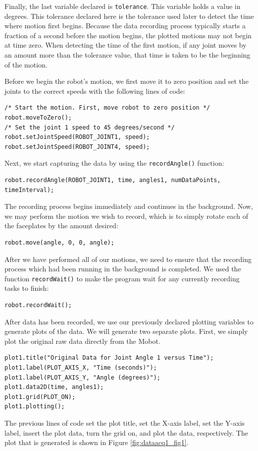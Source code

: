 \documentclass{article}
\begin{document}
Finally, the last variable declared is \texttt{tolerance}. This variable 
holds a value in degrees. This tolerance declared here is the tolerance used
later to detect the time where motion first begins. Because the data recording 
process typically starts a fraction of a second before the motion begins, the
plotted motions may not begin at time zero. When detecting the time of the
first motion, if any joint moves by an amount more than the tolerance value, 
that time is taken to be the beginning of the motion.

Before we begin the robot's motion, we first move it to zero position and set the
joints to the correct speeds with the following lines of code:
\begin{verbatim}
/* Start the motion. First, move robot to zero position */
robot.moveToZero();
/* Set the joint 1 speed to 45 degrees/second */
robot.setJointSpeed(ROBOT_JOINT1, speed);
robot.setJointSpeed(ROBOT_JOINT4, speed);
\end{verbatim}

Next, we start capturing the data by using the \texttt{recordAngle()} function:
\begin{verbatim}
robot.recordAngle(ROBOT_JOINT1, time, angles1, numDataPoints, timeInterval);
\end{verbatim}

The recording process begins immediately and continues in the background. Now,
we may perform the motion we wish to record, which is to simply rotate each of
the faceplates by the amount desired:
\begin{verbatim}
robot.move(angle, 0, 0, angle);
\end{verbatim}

After we have performed all of our motions, we need to ensure that the recording
process which had been running in the background is completed. We used the function
\texttt{recordWait()} to make the program wait for any currently recording tasks
to finish:
\begin{verbatim}
robot.recordWait();
\end{verbatim}

After data has been recorded, we use our previously declared plotting variables to 
generate plots of the data. We will generate two separate plots. First, we simply
plot the original raw data directly from the Mobot.
\begin{verbatim}
plot1.title("Original Data for Joint Angle 1 versus Time");
plot1.label(PLOT_AXIS_X, "Time (seconds)");
plot1.label(PLOT_AXIS_Y, "Angle (degrees)");
plot1.data2D(time, angles1);
plot1.grid(PLOT_ON);
plot1.plotting();
\end{verbatim}
The previous lines of code set the plot title, set the X-axis label, set the Y-axis label,
insert the plot data, turn the grid on, and plot the data, respectively. The plot
that is generated is shown in Figure \ref{fig:dataacq1_fig1}. 
\end{document}
